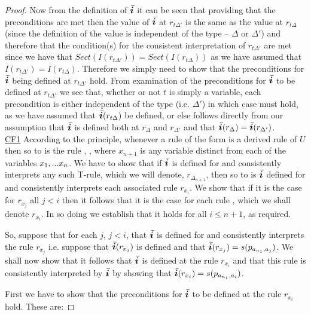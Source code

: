 \begin{proof}
Now from the definition of $\Ibar$ it can be seen that providing that the preconditions are met then  the value of $\Ibar$ at $r_{t\Delta'}$  is the same
as the value at $r_{t\Delta}$ (since the definition of the value is independent of the type -- $\Delta$ or $\Delta'$) and therefore that the condition(s) for the consistent interpretation of $r_{t\Delta'}$ are met 
since we have that $Sect(I(r_{t\Delta'}))=Sect(I(r_{t\Delta}))$ as we have assumed that $I(r_{t\Delta'})=I(r_{t\Delta})$. 
Therefore we simply need to show that the preconditions
for $\Ibar$ being defined at $r_{t\Delta'}$ hold.
From examination of the preconditions for $\Ibar$ to be defined at $r_{t\Delta'}$ we see that, whether or not $t$ is simply a variable, 
each precondition is either independent of the type (i.e. $\Delta'$) in which case must hold,  as we have assumed that 
$\Ibar(r_{t\Delta})$ be defined,
 or  else  follows directly from our assumption that 
$\Ibar$ is defined both at $r_\Delta$  and $r_{\Delta'}$ and that $\Ibar(r_\Delta) = \Ibar(r_{\Delta'})$.\\


\underline{CF1} According to the principle, whenever a rule of the form  is a derived rule of $U$ 
then so to is the rule , \foreachi[n+1], where $x_{n+1}$ is any variable distinct from each of the variables $x_1,...x_n$.
We have to show that if $\Ibar$ is defined for and consistently interprets any such T-rule, which we will denote, $r_{\Delta_{n+1}}$, 
then so to is $\Ibar$ defined for and consistently interprets each associated rule $r_{x_i}$. 
We show that  if it is the case for $r_{x_j}$ all $j <i$ 
then it follows that it is the case for each rule , which we shall denote  $r_{x_i}$. 
In so doing we establish that it holds for all $i \leq n +1 $, as required. 

So, suppose that for each $j$, $j < i$, that $\Ibar$ is defined for and consistently interprets the rule $r_{x_j}$ i.e. suppose that  $\Ibar(r_{x_j})$ is defined and that
$\Ibar(r_{x_j})=s(p_{a_{n_1},a_j})$. 
We shall now show that it follows that 
$\Ibar$ is defined at the rule $r_{x_i}$ and that this rule is consistently interpreted by $\Ibar$ by showing that
$\Ibar(r_{x_i})=s(p_{a_{n_1},a_i})$. 

First we have to show that the preconditions for $\Ibar$ to be defined at the rule $r_{x_i}$ hold. These are:


\end{proof}

